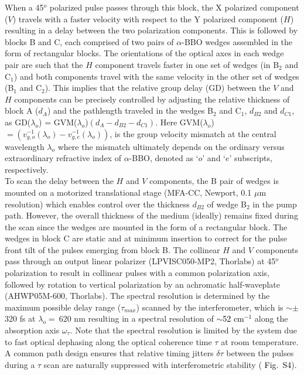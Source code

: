 \documentclass[%
aip,
amsmath,amssymb,
preprint,%
]{revtex4-2}
\newcommand*{\vt}[1]{\textcolor{black}{ #1}}
\newcommand*{\si}[1]{\textcolor{black}{ #1}}
\begin{document}
When a 45$^o$ polarized pulse passes through this block, the X polarized component ($V$) travels with a faster velocity with respect to the Y polarized component ($H$) resulting in a delay between the two polarization components. This is followed by blocks B and C, each comprised of two pairs of $\alpha$-BBO wedges assembled in the form of rectangular blocks. The orientations of the optical axes in each wedge pair are such that the $H$ component travels faster in one set of wedges (in B$_2$ and C$_1$) and both components travel with the same velocity in the other set of wedges (B$_1$ and C$_2$). This implies that the relative group delay (GD) between the $V$ and $H$ components can be precisely controlled by adjusting the relative thickness of block A ($d_A$) and the pathlength traveled in the wedges B$_2$ and C$_1$, $d_{B2}$ and $d_{C1}$, as GD($\lambda_o$) = GVM($\lambda_o$)$(d_A - d_{B2} - d_{C1})$. Here GVM($\lambda_o$) $= (v_{g,o}^{-1}(\lambda_o) - v_{g,e}^{-1}(\lambda_o))$, is the group velocity mismatch at the central wavelength $\lambda_o$ where the mismatch ultimately depends on the ordinary versus extraordinary refractive index of $\alpha$-BBO, denoted as `$o$' and `$e$' subscripts, respectively. \\

To scan the delay between the $H$ and $V$ components, the B pair of wedges is mounted on a motorized translational stage (MFA-CC, Newport, 0.1 $\mu$m resolution) which enables control over the thickness $d_{B2}$ of wedge B$_2$ in the pump path. However, the overall thickness of the medium (ideally) remains fixed during the scan since the wedges are mounted in the form of a rectangular block. The wedges in block C are static and at minimum insertion to correct for the pulse front tilt of the pulses emerging from block B. The collinear $H$ and $V$ components pass through an output linear polarizer ({LPVISC050-MP2, Thorlabs}) at 45$^o$ polarization to result in collinear pulses with a common polarization axis, followed by rotation to vertical polarization by an achromatic half-waveplate ({AHWP05M-600, Thorlabs}). The spectral resolution is determined by the maximum possible delay range ($\tau_{max}$) scanned by the interferometer, which is $\sim\pm$320 fs at $\lambda_o =~$620 nm resulting in a spectral resolution of \vt{$\sim${52} cm$^{-1}$} along the absorption axis $\omega_{\tau}$. Note that the spectral resolution is limited by the system due to fast optical dephasing along the optical coherence time $\tau$ at room temperature. A common path design ensures that relative timing jitters $\delta\tau$ between the pulses during a $\tau$ scan are naturally suppressed with interferometric stability\cite{Cerullo2014} (\si{Fig.~S4}). 
\end{document}
